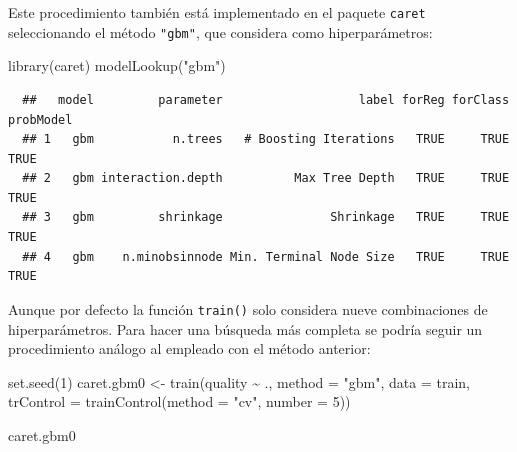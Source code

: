 \documentclass[
]{book}
\newenvironment{Shaded}{\begin{snugshade}}{\end{snugshade}}
\newcommand{\AttributeTok}[1]{\textcolor[rgb]{0.77,0.63,0.00}{#1}}
\newcommand{\DecValTok}[1]{\textcolor[rgb]{0.00,0.00,0.81}{#1}}
\newcommand{\FunctionTok}[1]{\textcolor[rgb]{0.00,0.00,0.00}{#1}}
\newcommand{\NormalTok}[1]{#1}
\newcommand{\OtherTok}[1]{\textcolor[rgb]{0.56,0.35,0.01}{#1}}
\newcommand{\SpecialCharTok}[1]{\textcolor[rgb]{0.00,0.00,0.00}{#1}}
\newcommand{\StringTok}[1]{\textcolor[rgb]{0.31,0.60,0.02}{#1}}
\theoremstyle{break}
\theoremstyle{nonumberplain}
\begin{document}
Este procedimiento también está implementado en el paquete \texttt{caret} seleccionando el método \texttt{"gbm"}, que considera como hiperparámetros:

\begin{Shaded}
\begin{Highlighting}[]
\FunctionTok{library}\NormalTok{(caret)}
\FunctionTok{modelLookup}\NormalTok{(}\StringTok{"gbm"}\NormalTok{)}
\end{Highlighting}
\end{Shaded}

\begin{verbatim}
  ##   model         parameter                   label forReg forClass probModel
  ## 1   gbm           n.trees   # Boosting Iterations   TRUE     TRUE      TRUE
  ## 2   gbm interaction.depth          Max Tree Depth   TRUE     TRUE      TRUE
  ## 3   gbm         shrinkage               Shrinkage   TRUE     TRUE      TRUE
  ## 4   gbm    n.minobsinnode Min. Terminal Node Size   TRUE     TRUE      TRUE
\end{verbatim}

Aunque por defecto la función \texttt{train()} solo considera nueve combinaciones de hiperparámetros. Para hacer una búsqueda más completa se podría seguir un procedimiento análogo al empleado con el método anterior:

\begin{Shaded}
\begin{Highlighting}[]
\FunctionTok{set.seed}\NormalTok{(}\DecValTok{1}\NormalTok{)}
\NormalTok{caret.gbm0 }\OtherTok{\textless{}{-}} \FunctionTok{train}\NormalTok{(quality }\SpecialCharTok{\textasciitilde{}}\NormalTok{ ., }\AttributeTok{method =} \StringTok{"gbm"}\NormalTok{, }\AttributeTok{data =}\NormalTok{ train,}
                   \AttributeTok{trControl =} \FunctionTok{trainControl}\NormalTok{(}\AttributeTok{method =} \StringTok{"cv"}\NormalTok{, }\AttributeTok{number =} \DecValTok{5}\NormalTok{))}
\end{Highlighting}
\end{Shaded}

\begin{Shaded}
\begin{Highlighting}[]
\NormalTok{caret.gbm0}
\end{Highlighting}
\end{Shaded}
\end{document}
